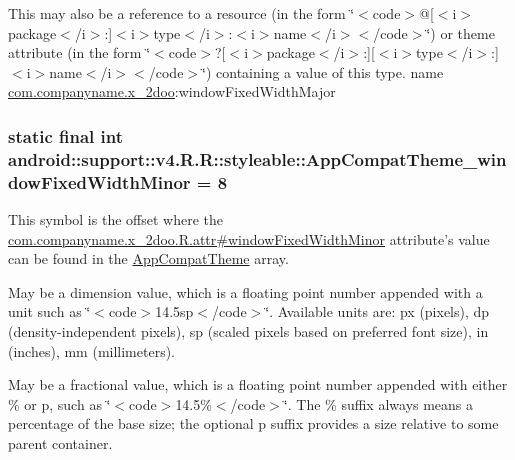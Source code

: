 This may also be a reference to a resource (in the form \char`\"{}$<$code$>$@\mbox{[}$<$i$>$package$<$/i$>$:\mbox{]}$<$i$>$type$<$/i$>$:$<$i$>$name$<$/i$>$$<$/code$>$\char`\"{}) or theme attribute (in the form \char`\"{}$<$code$>$?\mbox{[}$<$i$>$package$<$/i$>$:\mbox{]}\mbox{[}$<$i$>$type$<$/i$>$:\mbox{]}$<$i$>$name$<$/i$>$$<$/code$>$\char`\"{}) containing a value of this type.  name \hyperlink{namespacecom_1_1companyname_1_1x__2doo}{com.companyname.x\_\-2doo}:windowFixedWidthMajor \hypertarget{classandroid_1_1support_1_1v4_1_1_r_1_1styleable_0de992b88b66a205f256dcedf020c78e}{
\subsubsection[{AppCompatTheme\_\-windowFixedWidthMinor}]{\setlength{\rightskip}{0pt plus 5cm}static final int android::support::v4.R.R::styleable::AppCompatTheme\_\-windowFixedWidthMinor = 8}}
\label{classandroid_1_1support_1_1v4_1_1_r_1_1styleable_0de992b88b66a205f256dcedf020c78e}


This symbol is the offset where the \hyperlink{classcom_1_1companyname_1_1x__2doo_1_1_r_1_1attr_500cd629398e1c2f30d984a150e781e7}{com.companyname.x\_\-2doo.R.attr\#windowFixedWidthMinor} attribute's value can be found in the \hyperlink{classandroid_1_1support_1_1v4_1_1_r_1_1styleable_0873e92ba21076bb5a4aeadeb7f5779f}{AppCompatTheme} array.

May be a dimension value, which is a floating point number appended with a unit such as \char`\"{}$<$code$>$14.5sp$<$/code$>$\char`\"{}. Available units are: px (pixels), dp (density-independent pixels), sp (scaled pixels based on preferred font size), in (inches), mm (millimeters). 

May be a fractional value, which is a floating point number appended with either \% or p, such as \char`\"{}$<$code$>$14.5\%$<$/code$>$\char`\"{}. The \% suffix always means a percentage of the base size; the optional p suffix provides a size relative to some parent container. 

